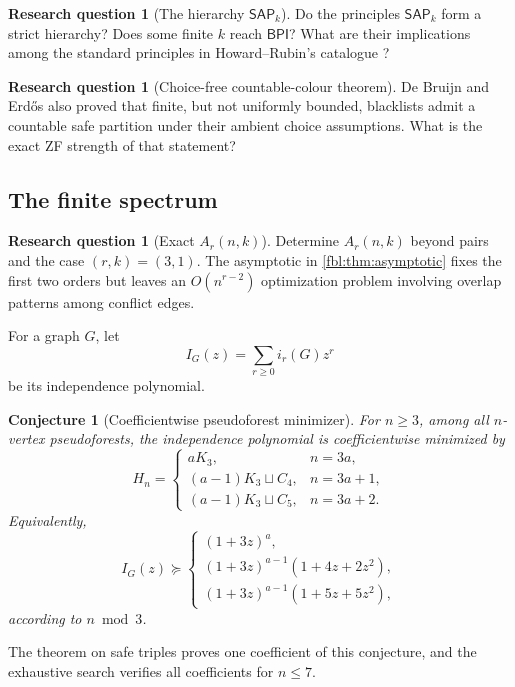 \documentclass[11pt]{article}
\newtheorem{conjecture}[theorem]{Conjecture}
\theoremstyle{definition}
\newtheorem{question}[theorem]{Research question}
\theoremstyle{remark}
\newcommand{\BPI}{\mathsf{BPI}}
\newcommand{\SAP}{\mathsf{SAP}}
\begin{document}
\begin{question}[The hierarchy $\SAP_k$]\label{fbl:q:hierarchy}
Do the principles $\SAP_k$ form a strict hierarchy?  Does some finite $k$
reach $\BPI$?  What are their implications among the standard principles in
Howard--Rubin's catalogue \cite{HowardRubin}?
\end{question}

\begin{question}[Choice-free countable-colour theorem]\label{fbl:q:countable}
De Bruijn and Erd\H{o}s also proved that finite, but not uniformly bounded,
blacklists admit a countable safe partition under their ambient choice
assumptions.  What is the exact ZF strength of that statement?
\end{question}

\subsection{The finite spectrum}

\begin{question}[Exact $A_r(n,k)$]\label{fbl:q:exact}
Determine $A_r(n,k)$ beyond pairs and the case $(r,k)=(3,1)$.  The asymptotic
in \cref{fbl:thm:asymptotic} fixes the first two orders but leaves an
$O(n^{r-2})$ optimization problem involving overlap patterns among conflict
edges.
\end{question}

For a graph $G$, let
\[
       I_G(z)=\sum_{r\ge0}i_r(G)z^r
\]
be its independence polynomial.

\begin{conjecture}[Coefficientwise pseudoforest minimizer]
\label{fbl:conj:pseudoforest-poly}
For $n\ge3$, among all $n$-vertex pseudoforests, the independence polynomial
is coefficientwise minimized by
\[
 H_n=
 \begin{cases}
  aK_3, &n=3a,\\
  (a-1)K_3\sqcup C_4, &n=3a+1,\\
  (a-1)K_3\sqcup C_5, &n=3a+2.
 \end{cases}
\]
Equivalently,
\[
 I_G(z)\succeq
 \begin{cases}
  (1+3z)^a,\\
  (1+3z)^{a-1}(1+4z+2z^2),\\
  (1+3z)^{a-1}(1+5z+5z^2),
 \end{cases}
\]
according to $n\bmod 3$.
\end{conjecture}

The theorem on safe triples proves one coefficient of this conjecture, and
the exhaustive search verifies all coefficients for $n\le7$.
\end{document}

